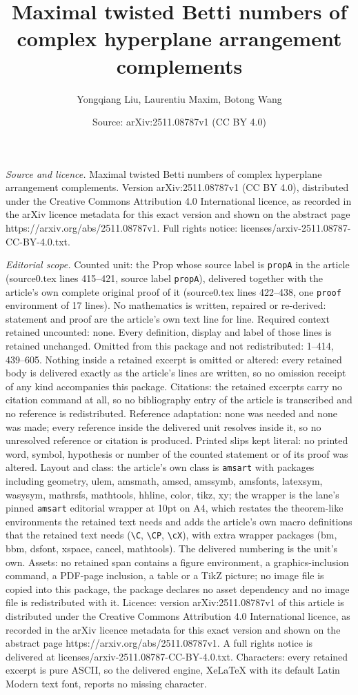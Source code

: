 \documentclass[10pt,a4paper]{amsart}
\title[Maximal twisted Betti numbers of complex hyperplane arrangem]{Maximal twisted Betti numbers of complex hyperplane arrangement complements}
\author{Yongqiang Liu, Laurentiu Maxim, Botong Wang}
\date{Source: arXiv:2511.08787v1 (CC BY 4.0)}
\begin{document}
\maketitle

\noindent\emph{Source and licence.} Maximal twisted Betti numbers of complex hyperplane arrangement complements. Version arXiv:2511.08787v1 (CC BY 4.0), distributed under the Creative Commons Attribution 4.0 International licence, as recorded in the arXiv licence metadata for this exact version and shown on the abstract page https://arxiv.org/abs/2511.08787v1. Full rights notice: licenses/arxiv-2511.08787-CC-BY-4.0.txt.\par\smallskip

\noindent\textit{Editorial scope.} Counted unit: the Prop whose source label is \texttt{propA} in the article (source0.tex lines 415--421, source label \texttt{propA}), delivered together with the article's own complete original proof of it (source0.tex lines 422--438, one \texttt{proof} environment of 17 lines). No mathematics is written, repaired or re-derived: statement and proof are the article's own text line for line. Required context retained uncounted: none. Every definition, display and label of those lines is retained unchanged. Omitted from this package and not redistributed: 1--414, 439--605. Nothing inside a retained excerpt is omitted or altered: every retained body is delivered exactly as the article's lines are written, so no omission receipt of any kind accompanies this package. Citations: the retained excerpts carry no citation command at all, so no bibliography entry of the article is transcribed and no reference is redistributed. Reference adaptation: none was needed and none was made; every reference inside the delivered unit resolves inside it, so no unresolved reference or citation is produced. Printed slips kept literal: no printed word, symbol, hypothesis or number of the counted statement or of its proof was altered. Layout and class: the article's own class is \texttt{amsart} with packages including geometry, ulem, amsmath, amscd, amssymb, amsfonts, latexsym, wasysym, mathrsfs, mathtools, hhline, color, tikz, xy; the wrapper is the lane's pinned \texttt{amsart} editorial wrapper at 10pt on A4, which restates the theorem-like environments the retained text needs and adds the article's own macro definitions that the retained text needs (\texttt{\textbackslash C}, \texttt{\textbackslash CP}, \texttt{\textbackslash cX}), with extra wrapper packages (bm, bbm, dsfont, xspace, cancel, mathtools). The delivered numbering is the unit's own. Assets: no retained span contains a figure environment, a graphics-inclusion command, a PDF-page inclusion, a table or a TikZ picture; no image file is copied into this package, the package declares no asset dependency and no image file is redistributed with it. Licence: version arXiv:2511.08787v1 of this article is distributed under the Creative Commons Attribution 4.0 International licence, as recorded in the arXiv licence metadata for this exact version and shown on the abstract page https://arxiv.org/abs/2511.08787v1. A full rights notice is delivered at licenses/arxiv-2511.08787-CC-BY-4.0.txt. Characters: every retained excerpt is pure ASCII, so the delivered engine, XeLaTeX with its default Latin Modern text font, reports no missing character.
\end{document}

